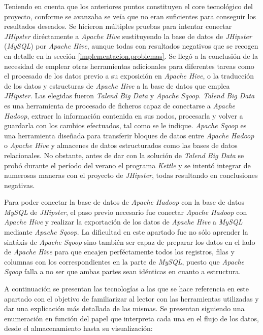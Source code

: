 	\par
	Teniendo en cuenta que los anteriores puntos constituyen el core tecnológico del proyecto, conforme se avanzaba se veía que no eran suficientes para conseguir los resultados deseados. Se hicieron múltiples pruebas para intentar conectar \textit{JHipster} diréctamente a \textit{Apache Hive} sustituyendo la base de datos de \textit{JHipster} (\textit{MySQL}) por \textit{Apache Hive}, aunque todas con resultados negativos que se recogen en detalle en la sección \ref{implementacion.problemas}. Se llegó a la conclusión de la necesidad de emplear otras herramientas adicionales para diferentes tareas como el procesado de los datos previo a su exposición en \textit{Apache Hive}, o la traducción de los datos y estructuras de \textit{Apache Hive} a la base de datos que emplea \textit{JHipster}. Las elegidas fueron \textit{Talend Big Data} y \textit{Apache Sqoop}. \textit{Talend Big Data} es una herramienta de procesado de ficheros capaz de conectarse a \textit{Apache Hadoop},  extraer la información contenida en sus nodos, procesarla y volver a guardarla con los cambios efectuados, tal como se le indique. \textit{Apache Sqoop} es una herramienta diseñada para transferir bloques de datos entre \textit{Apache Hadoop} o \textit{Apache Hive} y almacenes de datos estructurados como las bases de datos relacionales. No obstante, antes de dar con la solución de \textit{Talend Big Data} se probó durante el período del verano el programa \textit{Kettle} y se intentó integrar de numerosas maneras con el proyecto de \textit{JHipster}, todas resultando en conclusiones negativas.
	\par	
	Para poder conectar la base de datos de \textit{Apache Hadoop} con la base de datos \textit{MySQL} de \textit{JHipster}, el paso previo necesario fue conectar \textit{Apache Hadoop} con \textit{Apache Hive} y realizar la exportación de los datos de \textit{Apache Hive} a \textit{MySQL} mediante \textit{Apache Sqoop}. La dificultad en este apartado fue no sólo aprender la sintáxis de \textit{Apache Sqoop} sino también ser capaz de preparar los datos en el lado de \textit{Apache Hive} para que encajen perféctamente todos los registros, filas y columnas con los correspondientes en la parte de \textit{MySQL}, puesto que \textit{Apache Sqoop} falla a no ser que ambas partes sean idénticas en cuanto a estructura. \par
	A continuación se presentan las tecnologías a las que se hace referencia en este apartado con el objetivo de familiarizar al lector con las herramientas utilizadas y dar una explicación más detallada de las mismas. Se presentan siguiendo una enumeración en función del papel que interpreta cada una en el flujo de los datos, desde el almacenamiento hasta su visualización: 
